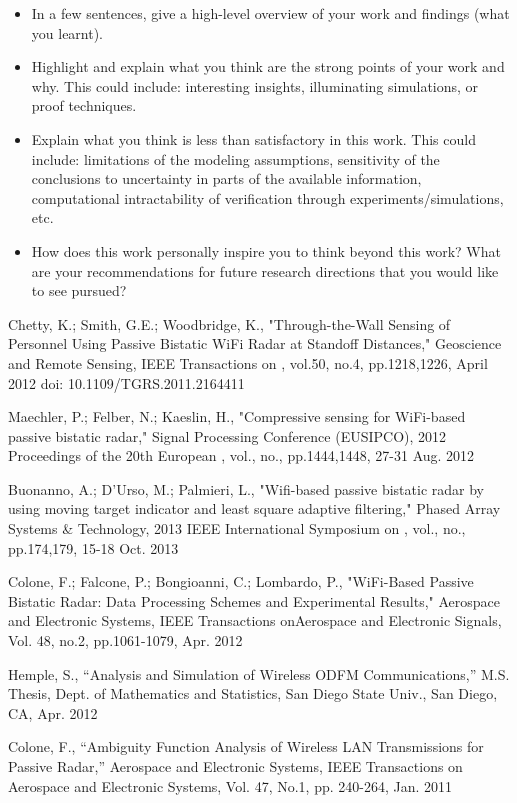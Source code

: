 \documentclass[article,11pt,onecolumn,final]{IEEEtran}
\begin{document}
\begin{itemize}

\item In a few sentences, give a high-level overview of your work and findings (what you learnt).

\item Highlight and explain what you think are the
strong points of your work and why. This could include: interesting
insights, illuminating simulations, or proof
techniques.

\item Explain what you think is less than
satisfactory in this work. This could include: limitations of the
modeling assumptions, sensitivity of the conclusions to uncertainty in
parts of the available information, computational intractability of
verification through experiments/simulations, etc.

\item How does this work personally
inspire you to think beyond this work? What are your recommendations
for future research directions that you would like to see pursued?

\end{itemize}

\begin{thebibliography}{100}

 Chetty, K.; Smith, G.E.; Woodbridge, K., "Through-the-Wall Sensing of Personnel Using Passive
Bistatic WiFi Radar at Standoff Distances," Geoscience and Remote Sensing, IEEE Transactions on ,
vol.50, no.4, pp.1218,1226, April 2012
doi: 10.1109/TGRS.2011.2164411

 Maechler, P.; Felber, N.; Kaeslin, H., "Compressive sensing for WiFi-based passive bistatic radar,"
Signal Processing Conference (EUSIPCO), 2012 Proceedings of the 20th European , vol., no.,
pp.1444,1448, 27-31 Aug. 2012

 Buonanno, A.; D'Urso, M.; Palmieri, L., "Wifi-based passive bistatic radar by using moving target
indicator and least square adaptive filtering," Phased Array Systems \& Technology, 2013 IEEE
International Symposium on , vol., no., pp.174,179, 15-18 Oct. 2013

 Colone, F.; Falcone, P.; Bongioanni, C.; Lombardo, P., "WiFi-Based Passive Bistatic Radar: Data
Processing Schemes and Experimental Results," Aerospace and Electronic Systems, IEEE Transactions
onAerospace and Electronic Signals, Vol. 48, no.2, pp.1061-1079, Apr. 2012

 Hemple, S., “Analysis and Simulation of Wireless ODFM Communications,” M.S. Thesis, Dept. of
Mathematics and Statistics, San Diego State Univ., San Diego, CA, Apr. 2012

 Colone, F., “Ambiguity Function Analysis of Wireless LAN Transmissions for Passive Radar,”
Aerospace and Electronic Systems, IEEE Transactions on Aerospace and Electronic Systems, Vol. 47, No.1,
pp. 240-264, Jan. 2011


\end{thebibliography}
\end{document}
